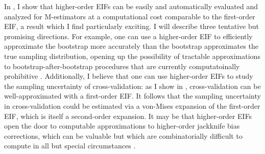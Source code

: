 In \citet{giordano:2019:hoij}, I show that higher-order EIFs can be easily and
automatically evaluated and analyzed for M-estimators at a computational cost
comparable to the first-order EIF, a result which I find particularly exciting.
I will describe three tentative but promising directions. For example, one can
use a higher-order EIF to efficiently approximate the bootstrap more accurately
than the bootstrap approximates the true sampling distribution, opening up the
possibility of tractable approximations to bootstrap-after-bootstrap procedures
that are currently computatoinally prohibitive \citep{shao:2012:jackknife}.
Additionally, I believe that one can use higher-order EIFs to study the sampling
uncertainty of cross-validation: as I show in \citet{giordano:2019:ij},
cross-validation can be well-approximated with a first-order EIF.  It follows
that the sampling uncertainty in cross-validation could be estimated via a
von-Mises expansion of the first-order EIF, which is itself a second-order
expansion.  It may be that higher-order EIFs open the door to computable
approximations to higher-order jackknife bias corrections, which can be valuable
but which are combinatorially difficult to compute in all but special
circumstances \citep{burnham:1978:jackknifebias}.



%
%


